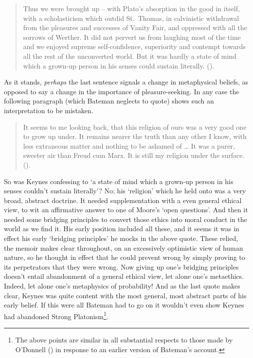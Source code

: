 \documentclass[
  11pt,
  letterpaper,
  DIV=11,
  numbers=noendperiod,
  twoside]{scrartcl}
\begin{document}
\begin{quote}
Thus we were brought up -- with Plato's absorption in the good in
itself, with a scholasticism which outdid St.~Thomas, in calvinistic
withdrawal from the pleasures and successes of Vanity Fair, and
oppressed with all the sorrows of Werther. It did not pervert us from
laughing most of the time and we enjoyed supreme self-confidence,
superiority and contempt towards all the rest of the unconverted world.
But it was hardly a state of mind which a grown-up person in his senses
could sustain literally. ().
\end{quote}

As it stands, \emph{perhaps} the last sentence signals a change in
metaphysical beliefs, as opposed to say a change in the importance of
pleasure-seeking. In any case the following paragraph (which Bateman
neglects to quote) shows such an interpretation to be mistaken.

\begin{quote}
It seems to me looking back, that this religion of ours was a very good
one to grow up under. It remains nearer the truth than any other I know,
with less extraneous matter and nothing to be ashamed of \ldots{} It was
a purer, sweeter air than Freud cum Marx. It is still my religion under
the surface. ().
\end{quote}

So was Keynes confessing to `a state of mind which a grown-up person in
his senses couldn't sustain literally'? No; his `religion' which he held
onto was a very broad, abstract doctrine. It needed supplementation with
a even general ethical view, to wit an affirmative answer to one of
Moore's `open questions'. And then it needed some bridging principles to
convert those ethics into moral conduct in the world as we find it. His
early position included all these, and it seems it was in effect his
early `bridging principles' he mocks in the above quote. These relied,
the memoir makes clear throughout, on an excessively optimistic view of
human nature, so he thought in effect that he could prevent wrong by
simply proving to its perpetrators that they were wrong. Now giving up
one's bridging principles doesn't entail abandonment of a general
ethical view, let alone one's metaethics. Indeed, let alone one's
metaphysics of probability! And as the last quote makes clear, Keynes
was quite content with the most general, most abstract parts of his
early belief. If this were all Bateman had to go on it wouldn't even
show Keynes had abandoned Strong Platonism\footnote{The above points are
  similar in all substantial respects to those made by O'Donnell
  () in response to an earlier version
  of Bateman's account.}.
\end{document}
